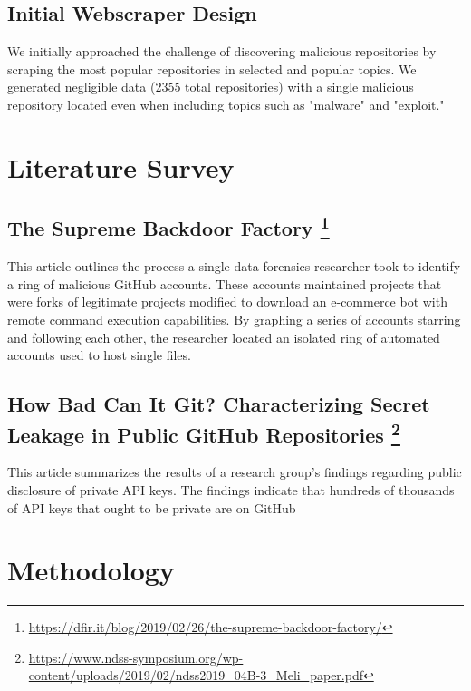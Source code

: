 \documentclass[]{acmart}
\begin{document}
\subsection{Initial Webscraper Design}
We initially approached the challenge of discovering malicious repositories by scraping the most popular repositories in selected and popular topics. We generated negligible data (2355 total repositories) with a single malicious repository located even when including topics such as "malware" and "exploit." 
\section{Literature Survey}

\subsection[The Supreme Backdoor Factory]{The Supreme Backdoor Factory         \footnote{\url{https://dfir.it/blog/2019/02/26/the-supreme-backdoor-factory/}}
}
This article outlines the process a single data forensics researcher took to identify a ring of malicious GitHub accounts. These accounts maintained projects that were  forks of legitimate projects modified to download an e-commerce bot with remote command execution capabilities. By graphing a series of accounts starring and following each other, the researcher located an isolated ring of automated accounts used to host single files. 

\subsection[How Bad Can It Git? Characterizing Secret Leakage in Public GitHub Repositories]{How Bad Can It Git? Characterizing Secret Leakage in Public GitHub Repositories \footnote{\url{https://www.ndss-symposium.org/wp-content/uploads/2019/02/ndss2019_04B-3_Meli_paper.pdf}}
}
This article summarizes the results of a research group's findings regarding public disclosure of private API keys. The findings indicate that hundreds of thousands of API keys that ought to be private are on GitHub
\section{Methodology}
\end{document}
